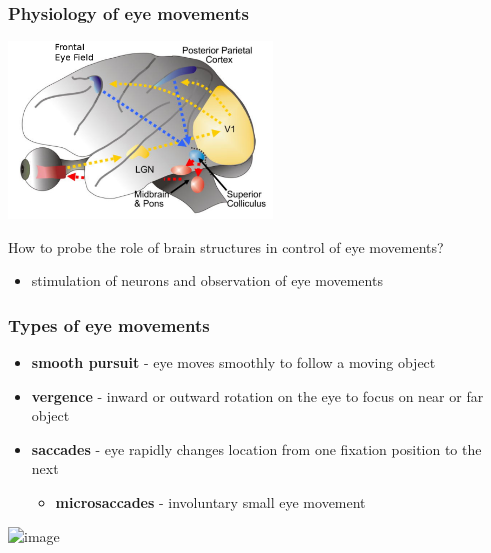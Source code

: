 \documentclass[]{beamer}
\begin{document}
\begin{frame}
\frametitle{Physiology of eye movements}
\begin{overlayarea}{120mm}{80mm}
 \begin{center}
\includegraphics[width=70mm]{figs/l7/wurtz_em_brain.png} 
\end{center}

How to probe the role of brain structures in control of eye movements?
\begin{itemize}
 \item<2->[$\rightarrow$] stimulation of neurons and observation of eye movements
\end{itemize}
\end{overlayarea}
\end{frame}


\begin{frame}
\frametitle{Types of eye movements}
\begin{overlayarea}{120mm}{80mm}
 \begin{itemize}
  \item[] \textbf{smooth pursuit} - eye moves smoothly to follow a moving object
  \item[] \textbf{vergence} - inward or outward rotation on the eye to focus on near or far object
  \item[] \textbf{saccades} - eye rapidly changes location from one fixation position to the next
 \begin{itemize}
 \item[] \textbf{microsaccades} - involuntary small eye movement
 \end{itemize}
 \end{itemize}

 \begin{center}
\includegraphics<2->[width=70mm]{figs/l7/classic_scan_path.png} 
\end{center}
\end{overlayarea}
\end{frame}
\end{document}
